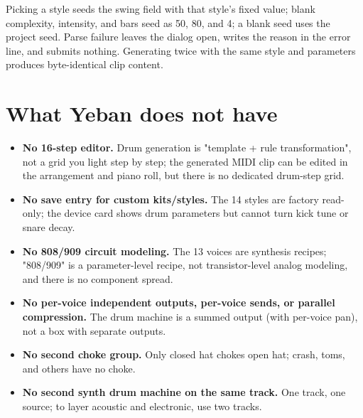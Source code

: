 Picking a style seeds the swing field with that style's fixed value; blank complexity, intensity, and bars seed as 50, 80, and 4; a blank seed uses the project seed. Parse failure leaves the dialog open, writes the reason in the error line, and submits nothing. Generating twice with the same style and parameters produces byte-identical clip content.




\section{What Yeban does not have}

\begin{itemize}
  \item \textbf{No 16-step editor.} Drum generation is "template + rule transformation", not a grid you light step by step; the generated MIDI clip can be edited in the arrangement and piano roll, but there is no dedicated drum-step grid.
  \item \textbf{No save entry for custom kits/styles.} The 14 styles are factory read-only; the device card shows drum parameters but cannot turn kick tune or snare decay.
  \item \textbf{No 808/909 circuit modeling.} The 13 voices are synthesis recipes; "808/909" is a parameter-level recipe, not transistor-level analog modeling, and there is no component spread.
  \item \textbf{No per-voice independent outputs, per-voice sends, or parallel compression.} The drum machine is a summed output (with per-voice pan), not a box with separate outputs.
  \item \textbf{No second choke group.} Only closed hat chokes open hat; crash, toms, and others have no choke.
  \item \textbf{No second synth drum machine on the same track.} One track, one source; to layer acoustic and electronic, use two tracks.
\end{itemize}

